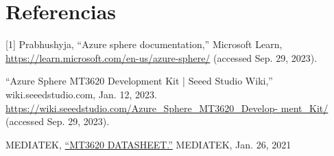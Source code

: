 \section{Referencias}
[1] Prabhushyja, “Azure sphere documentation,” Microsoft Learn, \href{https://learn.microsoft.com/en-us/azure-sphere/}{https://learn.microsoft.com/en-us/azure-sphere/} (accessed Sep. 29, 2023). \par
[2] “Azure Sphere MT3620 Development Kit | Seeed Studio Wiki,” wiki.seeedstudio.com, Jan. 12, 2023. \href{https://wiki.seeedstudio.com/Azure_Sphere_MT3620_Development_Kit/}{https://wiki.seeedstudio.com/Azure\_Sphere\_MT3620\_Develop-
ment\_Kit/}
(accessed Sep. 29, 2023). \par
[3] MEDIATEK, \href{https://d86o2zu8ugzlg.cloudfront.net/mediatek-craft/documents/mt3620/MT3620-Datasheet-v1.7.pdf}{“MT3620 DATASHEET.”}  MEDIATEK, Jan. 26, 2021 
‌